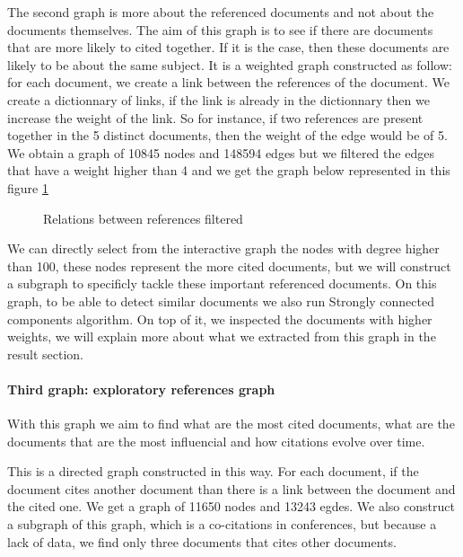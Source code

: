 \documentclass[article,twocolumn]{IEEEtran}
\begin{document}
The second graph is more about the referenced documents and not about
the documents themselves. The aim of this graph is to see if there are
documents that are more likely to cited together. If it is the case,
then these documents are likely to be about the same subject. It is a
weighted graph constructed as follow: for each document, we create a
link between the references of the document. We create a dictionnary of
links, if the link is already in the dictionnary then we increase the
weight of the link. So for instance, if two references are present
together in the 5 distinct documents, then the weight of the edge would
be of 5. We obtain a graph of 10845 nodes and 148594 edges but we
filtered the edges that have a weight higher than 4 and we get the graph
below represented in this figure \ref{fig6}




    \begin{figure}
        \begin{center}\end{center}
        \caption{Relations between references filtered}
        \label{fig6}
    \end{figure}
    
    We can directly select from the interactive graph the nodes with degree
higher than 100, these nodes represent the more cited documents, but we
will construct a subgraph to specificly tackle these important
referenced documents. On this graph, to be able to detect similar
documents we also run Strongly connected components algorithm. On top of
it, we inspected the documents with higher weights, we will explain more
about what we extracted from this graph in the result section.

    \hypertarget{third-graph-exploratory-references-graph}{%
\paragraph{Third graph: exploratory references
graph}\label{third-graph-exploratory-references-graph}}

With this graph we aim to find what are the most cited documents, what
are the documents that are the most influencial and how citations evolve
over time.

This is a directed graph constructed in this way. For each document, if
the document cites another document than there is a link between the
document and the cited one. We get a graph of 11650 nodes and 13243
egdes. We also construct a subgraph of this graph, which is a
co-citations in conferences, but because a lack of data, we find only
three documents that cites other documents.
\end{document}
